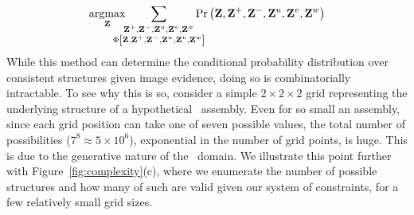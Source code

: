 \par\vspace*{-2ex}
\begin{equation}
  \argmax_{\mathbf{Z}}\hspace{-13pt}
  \sum_{\substack{\mathbf{Z}^+,\mathbf{Z}^-,\mathbf{Z}^u,\mathbf{Z}^v,\mathbf{Z}^w\\
      \Phi\left[\mathbf{Z},\mathbf{Z}^+,\mathbf{Z}^-,\mathbf{Z}^u,\mathbf{Z}^v,\mathbf{Z}^w\right]}}
  \hspace{-10pt}\Pr\left(\mathbf{Z},\mathbf{Z}^{+},\mathbf{Z}^{-},\mathbf{Z}^u,\mathbf{Z}^v,\mathbf{Z}^w\right)
  \label{eq:structure-estimation}
\vspace*{-0.5ex}
\end{equation}
%
While this method can determine the conditional probability distribution over
consistent structures given image evidence, doing so is combinatorially
intractable.
%
To see why this is so, consider a simple $2 \times 2 \times 2$ grid
representing the underlying structure of a hypothetical \LincolnLog\ assembly.
%
Even for so small an assembly, since each grid position can take one of seven
possible values, the total number of possibilities ($7^8 \approx 5 \times
10^6$), exponential in the number of grid points, is huge.
%
This is due to the generative nature of the \LincolnLog\ domain.
%
We illustrate this point further with Figure~\ref{fig:complexity}(c), where we
enumerate the number of possible structures and how many of such are valid
given our system of constraints, for a few relatively small grid sizes.

